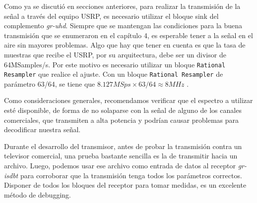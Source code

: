 Como ya se discutió en secciones anteriores, para realizar la transmisión de la señal a través del equipo USRP, es necesario utilizar el bloque sink del complemento \textit{gr-uhd}. Siempre que se mantengan las condiciones para la buena transmisión que se enumeraron en el capítulo 4, es esperable tener a la señal en el aire sin mayores problemas. Algo que hay que tener en cuenta es que la tasa de muestras que recibe el USRP, por su arquitectura, debe ser un divisor de 64MSamples/s. Por este motivo es necesario utilizar un bloque \verb|Rational Resampler| que realice el ajuste. Con un bloque \verb|Rational Resampler| de parámetro 63/64, se tiene que $8.127 MSps \times 63/64 \approx 8 MHz$ .

Como consideraciones generales, recomendamos verificar que el espectro a utilizar esté disponible, de forma de no solaparse con la señal de alguno de los canales comerciales, que transmiten a alta potencia y podrían causar problemas para decodificar nuestra señal.

Durante el desarrollo del transmisor, antes de probar la transmisión contra un televisor comercial, una prueba bastante sencilla es la de transmitir hacia un archivo. Luego, podemos usar ese archivo como entrada de datos al receptor \textit{gr-isdbt} para corroborar que la transmisión tenga todos los parámetros correctos. Disponer de todos los bloques del receptor para tomar medidas, es un excelente método de debugging.